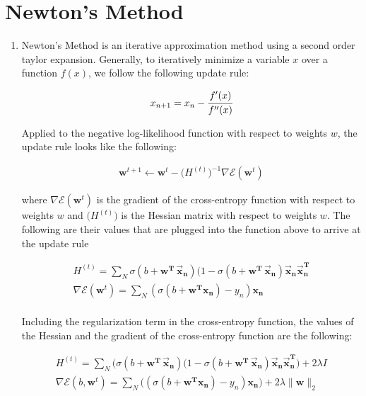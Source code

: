 \documentclass[12pt]{article}
\begin{document}
\section{Newton's Method}
\begin{enumerate}[label=\alph*.]

	\item Newton's Method is an iterative approximation method using a second order taylor expansion. Generally, to iteratively minimize a variable $x$ over a function $f(x)$, we follow the following update rule:

	\begin{gather*}
		x_{n+1} = x_n - \cfrac{f'(x)}{f''(x)}
	\end{gather*}

	Applied to the negative log-likelihood function with respect to weights $w$, the update rule looks like the following: 

	\begin{gather*}
		\mathbf{w}^{t+1} \leftarrow \mathbf{w}^t - \big( H^{(t)} \big)^{-1} \nabla \mathcal{E}(\mathbf{w}^t)
	\end{gather*}
	
	where $\nabla \mathcal{E}(\mathbf{w}^t)$ is the gradient of the cross-entropy function with respect to weights $w$ and $\big( H^{(t)} \big)$ is the Hessian matrix with respect to weights $w$. The following are their values that are plugged into the function above to arrive at the update rule

	\begin{gather*}
		H^{(t)} = \sum_N{\sigma(b + \mathbf{w^T \, \vec{x}_n})(1 - \sigma(b + \mathbf{w^T \, \vec{x}_n})\mathbf{\vec{x}_n}}\mathbf{\vec{x}_n^T}  \\
		\nabla \mathcal{E}(\mathbf{w}^t) = \sum_N{(\sigma(b + \mathbf{w^T x_n}) - y_n) \mathbf{x_n}} \\
	\end{gather*}

	Including the regularization term in the cross-entropy function, the values of the Hessian and the gradient of the cross-entropy function are the following:

	\begin{gather*}
		H^{(t)} = \sum_N{ \bigg( \sigma(b + \mathbf{w^T \, \vec{x}_n})(1 - \sigma(b + \mathbf{w^T \, \vec{x}_n})\mathbf{\vec{x}_n}}\mathbf{\vec{x}_n^T} \bigg) + 2 \lambda I  \\
		\nabla \mathcal{E}(b, \mathbf{w}^t) = \sum_N{ \bigg( ( \sigma(b + \mathbf{w^T x_n}) - y_n) \mathbf{x_n} \bigg) + 2 \lambda \lVert \mathbf{w} \rVert_2  }
	\end{gather*}


\end{enumerate}
\end{document}
